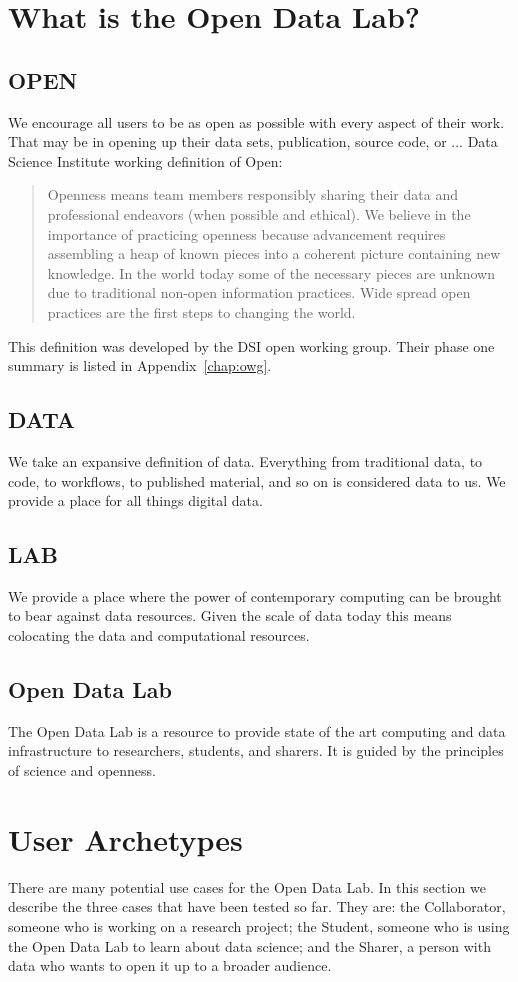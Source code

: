 \section{What is the Open Data Lab?}
\subsection*{OPEN}
We encourage all users to be as open as possible with every aspect of their work. That may be in opening up their data sets, publication, source code, or ...
Data Science Institute working definition of Open:
\begin{quote}
Openness means team members responsibly sharing their data and professional endeavors (when possible and ethical). We believe in the importance of practicing openness because advancement requires assembling a heap of known pieces into a coherent picture containing new knowledge. In the world today some of the necessary pieces are unknown due to traditional non-open information practices. Wide spread open practices are the first steps to changing the world.
\end{quote}

This definition was developed by the DSI open working group. Their phase one summary is listed in Appendix~\ref{chap:owg}.

\subsection*{DATA}
We take an expansive definition of data. Everything from traditional data, to code, to workflows, to published material, and so on is considered data to us. We provide a place for all things digital data.
\subsection*{LAB}
We provide a place where the power of contemporary computing can be brought to bear against data resources. Given the scale of data today this means colocating the data and computational resources.
\subsection*{Open Data Lab}
The Open Data Lab is a resource to provide state of the art computing and data infrastructure to researchers, students, and sharers. It is guided by the principles of science and openness.
 
\section{User Archetypes}
\label{sec:archetypes}
There are many potential use cases for the Open Data Lab. In this section we describe the three cases that have been tested so far. They are: the Collaborator, someone who is working on a research project; the Student, someone who is using the Open Data Lab to learn about data science; and the Sharer, a person with data who wants to open it up to a broader audience.

